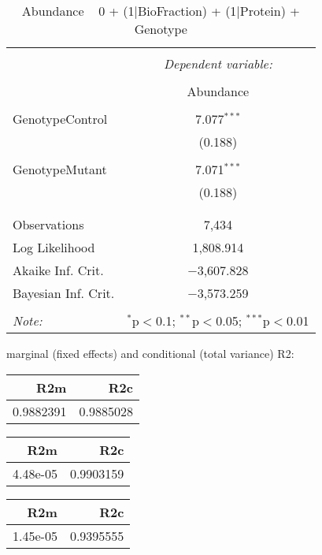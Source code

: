 \documentclass[11pt]{report}
\begin{document}
\begin{table}[!htbp] \centering 
  \caption{Abundance ~ 0 + (1|BioFraction) + (1|Protein) + Genotype} 
  \label{} 
\begin{tabular}{@{\extracolsep{5pt}}lc} 
\\[-1.8ex]\hline 
\hline \\[-1.8ex] 
 & \multicolumn{1}{c}{\textit{Dependent variable:}} \\ 
\cline{2-2} 
\\[-1.8ex] & Abundance \\ 
\hline \\[-1.8ex] 
 GenotypeControl & 7.077$^{***}$ \\ 
  & (0.188) \\ 
  & \\ 
 GenotypeMutant & 7.071$^{***}$ \\ 
  & (0.188) \\ 
  & \\ 
\hline \\[-1.8ex] 
Observations & 7,434 \\ 
Log Likelihood & 1,808.914 \\ 
Akaike Inf. Crit. & $-$3,607.828 \\ 
Bayesian Inf. Crit. & $-$3,573.259 \\ 
\hline 
\hline \\[-1.8ex] 
\textit{Note:}  & \multicolumn{1}{r}{$^{*}$p$<$0.1; $^{**}$p$<$0.05; $^{***}$p$<$0.01} \\ 
\end{tabular} 
\end{table} 
marginal (fixed effects) and conditional (total variance) R2:

\begin{tabular}{r|r}
\hline
R2m & R2c\\
\hline
0.9882391 & 0.9885028\\
\hline
\end{tabular}

\begin{tabular}{r|r}
\hline
R2m & R2c\\
\hline
4.48e-05 & 0.9903159\\
\hline
\end{tabular}

\begin{tabular}{r|r}
\hline
R2m & R2c\\
\hline
1.45e-05 & 0.9395555\\
\hline
\end{tabular}
\end{document}
